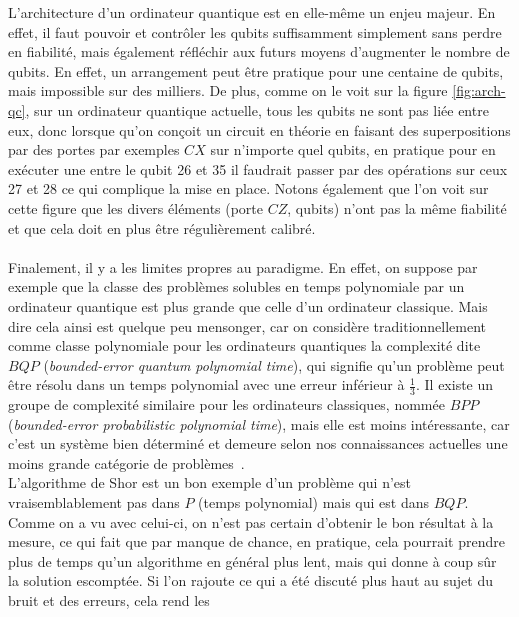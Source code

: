 L'architecture d'un ordinateur quantique est en elle-même un enjeu majeur.
En effet, il faut pouvoir et contrôler les qubits suffisamment simplement sans perdre en fiabilité,
mais également réfléchir aux futurs moyens d'augmenter le nombre de qubits.
En effet, un arrangement peut être pratique pour une centaine de qubits, mais impossible sur des
milliers.
De plus, comme on le voit sur la figure \ref{fig:arch-qc}, sur un ordinateur quantique actuelle,
tous les qubits ne sont pas liée entre eux, donc lorsque qu'on conçoit un circuit en théorie en
faisant des superpositions par des portes par exemples $CX$ sur n'importe quel qubits, en pratique
pour en exécuter une entre le qubit 26 et 35 il faudrait passer par des opérations sur ceux 27 et
28 ce qui complique la mise en place.
Notons également que l'on voit sur cette figure que les divers éléments (porte $CZ$, qubits) n'ont
pas la même fiabilité et que cela doit en plus être régulièrement calibré.\\ \\
Finalement, il y a les limites propres au paradigme.
En effet, on suppose par exemple que la classe des problèmes solubles en temps polynomiale par
un ordinateur quantique est plus grande que celle d'un ordinateur classique.
Mais dire cela ainsi est quelque peu mensonger, car on considère traditionnellement comme classe
polynomiale pour les ordinateurs quantiques la complexité dite $BQP$
(\textit{bounded-error quantum polynomial time}), qui signifie qu'un problème peut être résolu
dans un temps polynomial avec une erreur inférieur à $\frac{1}{3}$.
Il existe un groupe de complexité similaire pour les ordinateurs classiques, nommée $BPP$
(\textit{bounded-error probabilistic polynomial time}), mais elle est moins intéressante,
car c'est un système bien déterminé et demeure selon nos connaissances actuelles une moins
grande catégorie de problèmes~\cite{wiki:bqp}.\\
L'algorithme de Shor est un bon exemple d'un problème qui n'est vraisemblablement pas dans
$P$ (temps polynomial) mais qui est dans $BQP$.
Comme on a vu avec celui-ci, on n'est pas certain d'obtenir le bon résultat à la mesure, ce qui
fait que par manque de chance, en pratique, cela pourrait prendre plus de temps qu'un algorithme
en général plus lent, mais qui donne à coup sûr la solution escomptée.
Si l'on rajoute ce qui a été discuté plus haut au sujet du bruit et des erreurs, cela rend les
